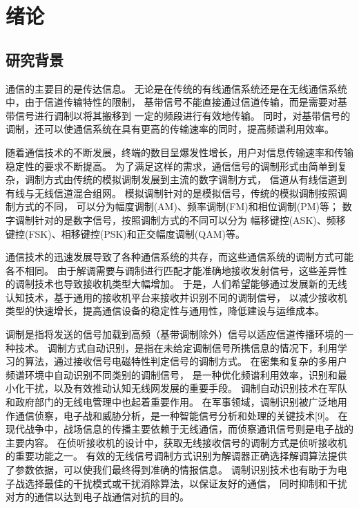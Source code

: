 \chapter{绪论}
\section{研究背景}

通信的主要目的是传达信息。 
无论是在传统的有线通信系统还是在无线通信系统中，由于信道传输特性的限制，
基带信号不能直接通过信道传输，而是需要对基带信号进行调制以将其搬移到 一定的频段进行有效地传输。 
同时，对基带信号的调制，还可以使通信系统在具有更高的传输速率的同时，提高频谱利用效率。\par

随着通信技术的不断发展，终端的数目呈爆发性增长，用户对信息传输速率和传输稳定性的要求不断提高。
为了满足这样的需求，通信信号的调制形式由简单到复杂，调制方式由传统的模拟调制发展到主流的数字调制方式，
信道从有线信道到有线与无线信道混合组网。
模拟调制针对的是模拟信号，传统的模拟调制按照调制方式的不同，
可以分为幅度调制(AM)、频率调制(FM)和相位调制(PM)等；
数字调制针对的是数字信号，按照调制方式的不同可以分为
幅移键控(ASK)、频移键控(FSK)、相移键控(PSK)和正交幅度调制(QAM)等。 \par

通信技术的迅速发展导致了各种通信系统的共存，而这些通信系统的调制方式可能各不相同。
由于解调需要与调制进行匹配才能准确地接收发射信号，这些差异性的调制技术也导致接收机类型大幅增加。
于是，人们希望能够通过发展新的无线认知技术，基于通用的接收机平台来接收并识别不同的调制信号，
以减少接收机类型的快速增长，提高通信设备的稳定性与通用性，降低建设与运维成本。 \par

调制是指将发送的信号加载到高频（基带调制除外）信号以适应信道传播环境的一种技术。
调制方式自动识别，是指在未给定调制信号所携信息的情况下，利用学习的算法，通过接收信号电磁特性判定信号的调制方式。
在密集和复杂的多用户频谱环境中自动识别不同类别的调制信号，
是一种优化频谱利用效率，识别和最小化干扰，以及有效推动认知无线网发展的重要手段。
调制自动识别技术在军队和政府部门的无线电管理中也起着重要作用。
在军事领域，调制识别被广泛地用作通信侦察，电子战和威胁分析，是一种智能信号分析和处理的关键技术[9]。
在现代战争中，战场信息的传播主要依赖于无线通信，而侦察通讯信号则是电子战的主要内容。
在侦听接收机的设计中，获取无线接收信号的调制方式是侦听接收机的重要功能之一。
有效的无线信号调制方式识别为解调器正确选择解调算法提供了参数依据，可以使我们最终得到准确的情报信息。
调制识别技术也有助于为电子战选择最佳的干扰模式或干扰消除算法，以保证友好的通信，
同时抑制和干扰对方的通信以达到电子战通信对抗的目的。\par

